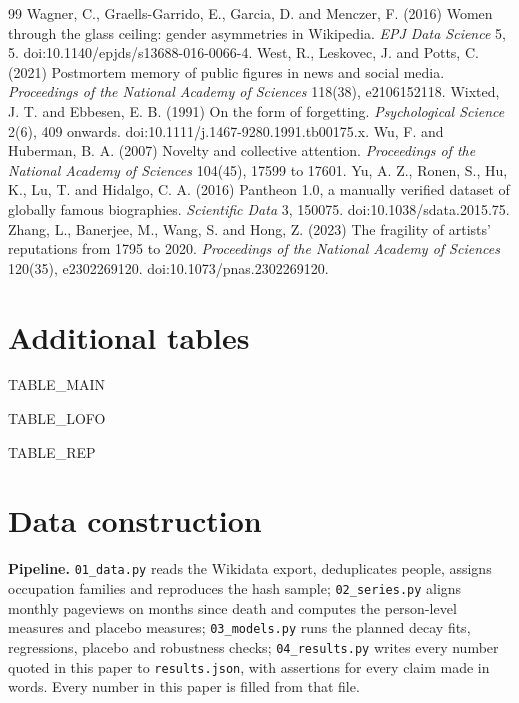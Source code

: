 \documentclass[11pt,a4paper]{article}
\begin{document}
\begin{thebibliography}{99}
 Wagner, C., Graells-Garrido, E., Garcia, D. and Menczer, F. (2016) Women through the glass ceiling: gender asymmetries in Wikipedia. \textit{EPJ Data Science} 5, 5. doi:10.1140/epjds/s13688-016-0066-4.
 West, R., Leskovec, J. and Potts, C. (2021) Postmortem memory of public figures in news and social media. \textit{Proceedings of the National Academy of Sciences} 118(38), e2106152118.
 Wixted, J. T. and Ebbesen, E. B. (1991) On the form of forgetting. \textit{Psychological Science} 2(6), 409 onwards. doi:10.1111/j.1467-9280.1991.tb00175.x.
 Wu, F. and Huberman, B. A. (2007) Novelty and collective attention. \textit{Proceedings of the National Academy of Sciences} 104(45), 17599 to 17601.
 Yu, A. Z., Ronen, S., Hu, K., Lu, T. and Hidalgo, C. A. (2016) Pantheon 1.0, a manually verified dataset of globally famous biographies. \textit{Scientific Data} 3, 150075. doi:10.1038/sdata.2015.75.
 Zhang, L., Banerjee, M., Wang, S. and Hong, Z. (2023) The fragility of artists' reputations from 1795 to 2020. \textit{Proceedings of the National Academy of Sciences} 120(35), e2302269120. doi:10.1073/pnas.2302269120.
\end{thebibliography}

\appendix
\section{Additional tables}
{{TABLE_MAIN}}

{{TABLE_LOFO}}

{{TABLE_REP}}

\section{Data construction}
\textbf{Pipeline.} \texttt{01\_data.py} reads the Wikidata export, deduplicates people, assigns occupation families and reproduces the hash sample; \texttt{02\_series.py} aligns monthly pageviews on months since death and computes the person-level measures and placebo measures; \texttt{03\_models.py} runs the planned decay fits, regressions, placebo and robustness checks; \texttt{04\_results.py} writes every number quoted in this paper to \texttt{results.json}, with assertions for every claim made in words. Every number in this paper is filled from that file.
\end{document}
